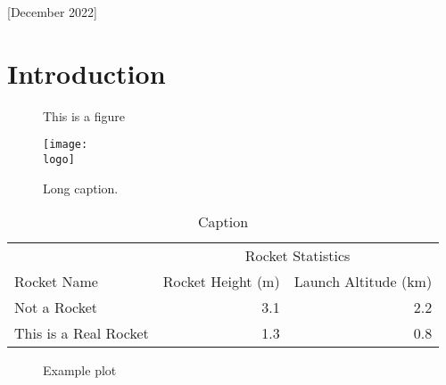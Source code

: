 \documentclass{article}
\newcommand{\logo}{images/PSP-2Color.png}
\begin{document}
    [December 2022]

    \newpage
    \pagestyle{toc}
    \tableofcontents

    \listoffigures
    \listoftables

    \newpage
    \pagestyle{regular}

    \section{Introduction}
    \lipsum[10]

    \begin{figure}
        \begin{center}
            This is a figure

            \texttt{[image: \\logo]}
        \end{center}
        \caption[Short caption]{Long caption.}
        \label{fig:figure}
    \end{figure}

    \begin{table}
        \begin{center}
            \begin{tabular}{lrr}
                \toprule
                & \multicolumn{2}{c}{Rocket Statistics} \\
                \cmidrule{2-3}
                Rocket Name & Rocket Height (\si{\meter}) & Launch Altitude (\si{\kilo\meter}) \\
                \midrule
                Not a Rocket & 3.1 & 2.2 \\
                This is a Real Rocket & 1.3 & 0.8 \\
                \bottomrule
            \end{tabular}
        \end{center}
        \caption{Caption}
        \label{tab:table}
    \end{table}

    \begin{figure}
        \begin{center}
        \end{center}
        \caption{Example plot}
    \end{figure}
\end{document}
